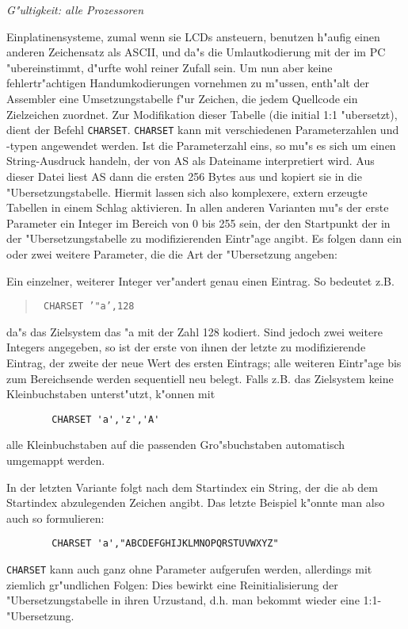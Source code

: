 \documentclass[12pt,a4paper,twoside]{report}
\newcommand{\tty}[1]{{\tt #1}}
\begin{document}
{\em G"ultigkeit: alle Prozessoren}

Einplatinensysteme, zumal wenn sie LCDs ansteuern, benutzen h"aufig
einen anderen Zeichensatz als ASCII, und da"s die Umlautkodierung mit
der im PC "ubereinstimmt, d"urfte wohl reiner Zufall sein.  Um nun
aber keine fehlertr"achtigen Handumkodierungen vornehmen zu m"ussen,
enth"alt der Assembler eine Umsetzungstabelle f"ur Zeichen, die jedem
Quellcode ein Zielzeichen zuordnet.  Zur Modifikation dieser Tabelle
(die initial 1:1 "ubersetzt), dient der Befehl \tty{CHARSET}.
\tty{CHARSET} kann mit verschiedenen Parameterzahlen und -typen angewendet
werden.  Ist die Parameterzahl eins, so mu"s es sich um einen
String-Ausdruck handeln, der von AS als Dateiname interpretiert wird.  Aus
dieser Datei liest AS dann die ersten 256 Bytes aus und kopiert sie in die
"Ubersetzungstabelle.  Hiermit lassen sich also komplexere, extern
erzeugte Tabellen in einem Schlag aktivieren.  In allen anderen Varianten
mu"s der erste Parameter ein Integer im Bereich von 0 bis 255 sein, der
den Startpunkt der in der "Ubersetzungstabelle zu modifizierenden
Eintr"age angibt.  Es folgen dann ein oder zwei weitere Parameter, die die
Art der "Ubersetzung angeben:

Ein einzelner, weiterer Integer ver"andert genau einen Eintrag.  So
bedeutet z.B.
\begin{quote}{\tt
        CHARSET '"a',128}
\end{quote}
da"s das Zielsystem das "a mit der Zahl 128 kodiert.  Sind jedoch zwei
weitere Integers angegeben, so ist der erste von ihnen der letzte zu
modifizierende Eintrag, der zweite der neue Wert des ersten Eintrags; alle
weiteren Eintr"age bis zum Bereichsende werden sequentiell neu belegt.
Falls z.B. das Zielsystem keine Kleinbuchstaben unterst"utzt, k"onnen mit
\begin{verbatim}
        CHARSET 'a','z','A'
\end{verbatim}
alle Kleinbuchstaben auf die passenden Gro"sbuchstaben automatisch
umgemappt werden.

In der letzten Variante folgt nach dem Startindex ein String, der die ab
dem Startindex abzulegenden Zeichen angibt.  Das letzte Beispiel k"onnte
man also auch so formulieren:
\begin{verbatim}
        CHARSET 'a',"ABCDEFGHIJKLMNOPQRSTUVWXYZ"
\end{verbatim}

\tty{CHARSET} kann auch ganz ohne Parameter aufgerufen werden, allerdings
mit ziemlich gr"undlichen Folgen: Dies bewirkt eine Reinitialisierung der
"Ubersetzungstabelle in ihren Urzustand, d.h. man bekommt wieder eine
1:1-"Ubersetzung.
\end{document}
